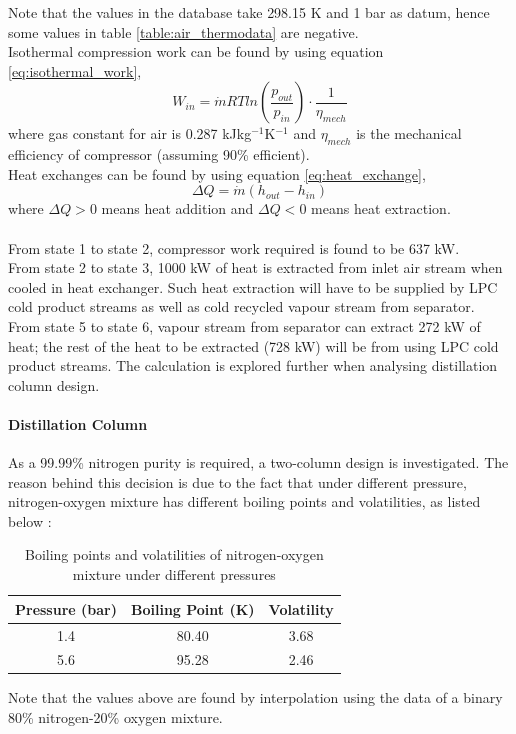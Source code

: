 \documentclass[11pt,oneside]{article}
\let\subsubsubsection\paragraph
\begin{document}
        \noindent Note that the values in the database take 298.15 K and 1 bar as datum, hence some values in table \ref{table:air_thermodata} are negative.\\
        \noindent Isothermal compression work can be found by using equation \ref{eq:isothermal_work},
        \begin{equation}
            W_{in} = \dot{m} RT ln\left(\frac{p_{out}}{p_{in}}\right)\cdot\frac{1}{\eta_{mech}}
            \label{eq:isothermal_work}
        \end{equation}
        where gas constant for air is 0.287 kJkg$^{-1}$K$^{-1}$ \citep{HLT} and ${\eta}_{mech}$ is the mechanical efficiency of compressor (assuming 90\% efficient). \\
        Heat exchanges can be found by using equation \ref{eq:heat_exchange},
        \begin{equation}
            \Delta Q = \dot{m} (h_{out} - h_{in})
            \label{eq:heat_exchange}
        \end{equation}
        where $\Delta Q > 0$ means heat addition and $\Delta Q < 0$ means heat extraction. \\
        \\
        From state 1 to state 2, compressor work required is found to be 637 kW. \\
        From state 2 to state 3, 1000 kW of heat is extracted from inlet air stream when cooled in heat exchanger. Such heat extraction will have to be supplied by LPC cold product streams as well as cold recycled vapour stream from separator. \\
        From state 5 to state 6, vapour stream from separator can extract 272 kW of heat; the rest of the heat to be extracted (728 kW) will be from using LPC cold product streams. The calculation is explored further when analysing distillation column design.
		\subsubsubsection{Distillation Column}
        As a 99.99\% nitrogen purity is required, a two-column design is investigated. The reason behind this decision is due to the fact that under different pressure, nitrogen-oxygen mixture has different boiling points and volatilities, as listed below \citep{VLEdata}:
        \begin{table}[H]
            \singlespacing
            \centering
	        \caption{Boiling points and volatilities of nitrogen-oxygen mixture under different pressures}
	        \label{table:BP_volatilities_of_mixture}
	
	        \begin{tabular}{|c|c|c|}
	        \hline
	        Pressure (bar)	& Boiling Point (K)	& Volatility \textalpha \\  \hline
	        1.4				& 80.40				& 3.68 \\   \hline
	        5.6				& 95.28				& 2.46 \\   \hline
	        \end{tabular}
	        \vspace{1ex}
	        
	        \raggedright Note that the values above are found by interpolation using the data of a binary 80\% nitrogen-20\% oxygen mixture.
        \end{table}
\end{document}
